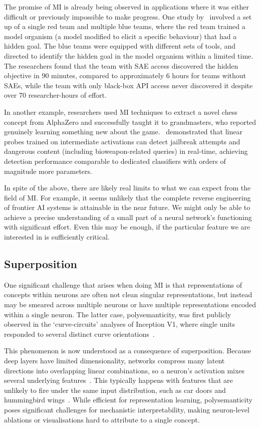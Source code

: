 The promise of MI is already being observed in applications where it was either difficult or previously impossible to make progress. One study by~\citet{marks_2025_auditing} involved a set up of a single red team and multiple blue teams, where the red team trained a model organism (a model modified to elicit a specific behaviour) that had a hidden goal. The blue teams were equipped with different sets of tools, and directed to identify the hidden goal in the model organism within a limited time. The researchers found that the team with SAE access discovered the hidden objective in 90 minutes, compared to approximately 6 hours for teams without SAEs, while the team with only black-box API access never discovered it despite over 70 researcher-hours of effort. 

In another example, researchers used MI techniques to extract a novel chess concept from AlphaZero and successfully taught it to grandmasters, who reported genuinely learning something new about the game.~\citet{cunningham2025cheap} demonstrated that linear probes trained on intermediate activations can detect jailbreak attempts and dangerous content (including bioweapon-related queries) in real-time, achieving detection performance comparable to dedicated classifiers with orders of magnitude more parameters.

In spite of the above, there are likely real limits to what we can expect from the field of MI. For example, it seems unlikely that the complete reverse engineering of frontier AI systems is attainable in the near future. We might only be able to achieve a precise understanding of a small part of a neural network's functioning with significant effort. Even this may be enough, if the particular feature we are interested in is sufficiently critical.

\subsection{Superposition}\label{subsec:superposition}
One significant challenge that arises when doing MI is that representations of concepts within neurons are often not clean singular representations, but instead may be smeared across multiple neurons or have multiple representations encoded within a single neuron. The latter case, polysemanticity, was first publicly observed in the `curve-circuits' analyses of Inception V1, where single units responded to several distinct curve orientations~\citep{cammarata2020curve}.  

This phenomenon is now understood as a consequence of superposition. Because deep layers have limited dimensionality, networks compress many latent directions into overlapping linear combinations, so a neuron's activation mixes several underlying features~\citep{olah_2020_zoom, elhage2022superposition}. This typically happens with features that are unlikely to fire under the same input distribution, such as car doors and hummingbird wings~\citep{olah_feature_2017}.  While efficient for representation learning, polysemanticity poses significant challenges for mechanistic interpretability, making neuron-level ablations or visualisations hard to attribute to a single concept.  

